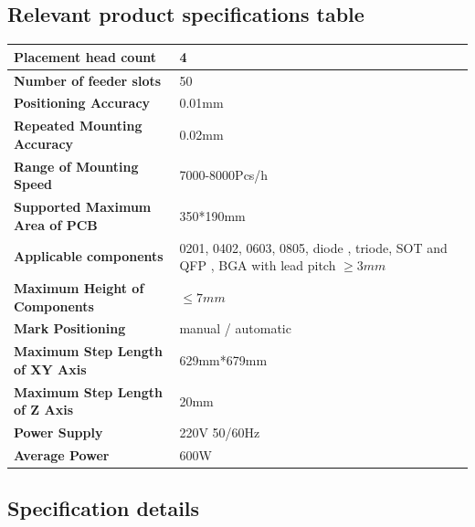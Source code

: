 \documentclass[a4paper,10pt]{report}
\begin{document}
\subsection{Relevant product specifications table}
\begin{table}[!htb]
{
\begin{tabularx}{\textwidth}{>{\bfseries}l|X}
 \hline
 Placement head count & 4 \\
 \hline
 Number of feeder slots & 50 \\
 \hline
 Positioning Accuracy & 0.01mm \\
 \hline
 Repeated Mounting Accuracy & 0.02mm \\
 \hline
 Range of Mounting Speed & 7000-8000Pcs/h\\
 \hline
 Supported Maximum Area of PCB & 350*190mm \\
 \hline
 Applicable components & 0201, 0402, 0603, 0805, diode , triode, SOT and QFP ,
BGA with lead pitch $\geq 3mm$  \\
 \hline
 Maximum Height of Components & $\leq 7mm $\\
 \hline
 Mark Positioning & manual / automatic\\
 \hline
 Maximum Step Length of XY Axis & 629mm*679mm\\
 \hline
 Maximum Step Length of Z Axis & 20mm\\
 \hline
 Power Supply & 220V 50/60Hz\\
 \hline
 Average Power & 600W\\
 \hline
\end{tabularx}}
\end{table}


\subsection{Specification details}
\end{document}
